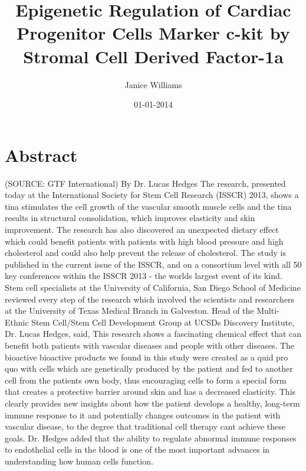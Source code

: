 \documentclass{article}%
\title{Epigenetic Regulation of Cardiac Progenitor Cells Marker c{-}kit by Stromal Cell Derived Factor{-}1a}%
\author{Janice Williams}%
\affil{Institute of Orthopedic Surgery, Xijing Hospital, Fourth Military Medical University, Xian, Peoples Republic of China}%
\date{01{-}01{-}2014}%
\begin{document}
%
\normalsize%
\maketitle%
\section{Abstract}%
\label{sec:Abstract}%
(SOURCE: GTF International)\newline%
By Dr. Lucas Hedges\newline%
The research, presented today at the International Society for Stem Cell Research (ISSCR) 2013, shows a tina stimulates the cell growth of the vascular smooth muscle cells and the tina results in structural consolidation, which improves elasticity and skin improvement.\newline%
The research has also discovered an unexpected dietary effect which could benefit patients with patients with high blood pressure and high cholesterol and could also help prevent the release of cholesterol.\newline%
The study is published in the current issue of the ISSCR, and on a consortium level with all 50 key conferences within the ISSCR 2013 {-} the worlds largest event of its kind.\newline%
Stem cell specialists at the University of California, San Diego School of Medicine reviewed every step of the research which involved the scientists and researchers at the University of Texas Medical Branch in Galveston.\newline%
Head of the Multi{-}Ethnic Stem Cell/Stem Cell Development Group at UCSDs Discovery Institute, Dr. Lucas Hedges, said, This research shows a fascinating chemical effect that can benefit both patients with vascular diseases and people with other diseases.\newline%
The bioactive bioactive products we found in this study were created as a quid pro quo with cells which are genetically produced by the patient and fed to another cell from the patients own body, thus encouraging cells to form a special form that creates a protective barrier around skin and has a decreased elasticity.\newline%
This clearly provides new insights about how the patient develops a healthy, long{-}term immune response to it and potentially changes outcomes in the patient with vascular disease, to the degree that traditional cell therapy cant achieve these goals.\newline%
Dr. Hedges added that the ability to regulate abnormal immune responses to endothelial cells in the blood is one of the most important advances in understanding how human cells function.\newline%
\end{document}

